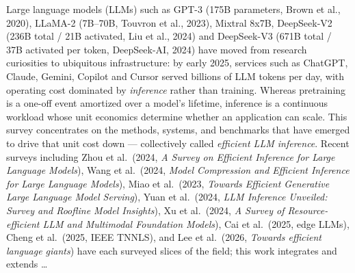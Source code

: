 Large language models (LLMs) such as GPT-3 (175B parameters, Brown et al., 2020), LLaMA-2 (7B--70B, Touvron et al., 2023), Mixtral 8x7B, DeepSeek-V2 (236B total / 21B activated, Liu et al., 2024) and DeepSeek-V3 (671B total / 37B activated per token, DeepSeek-AI, 2024) have moved from research curiosities to ubiquitous infrastructure: by early 2025, services such as ChatGPT, Claude, Gemini, Copilot and Cursor served billions of LLM tokens per day, with operating cost dominated by \emph{inference} rather than training. Whereas pretraining is a one-off event amortized over a model's lifetime, inference is a continuous workload whose unit economics determine whether an application can scale. This survey concentrates on the methods, systems, and benchmarks that have emerged to drive that unit cost down --- collectively called \emph{efficient LLM inference}. Recent surveys including Zhou et al.~(2024, \emph{A Survey on Efficient Inference for Large Language Models}), Wang et al.~(2024, \emph{Model Compression and Efficient Inference for Large Language Models}), Miao et al.~(2023, \emph{Towards Efficient Generative Large Language Model Serving}), Yuan et al.~(2024, \emph{LLM Inference Unveiled: Survey and Roofline Model Insights}), Xu et al.~(2024, \emph{A Survey of Resource-efficient LLM and Multimodal Foundation Models}), Cai et al.~(2025, edge LLMs), Cheng et al.~(2025, IEEE TNNLS), and Lee et al.~(2026, \emph{Towards efficient language giants}) have each surveyed slices of the field; this work integrates and extends \ldots{}
